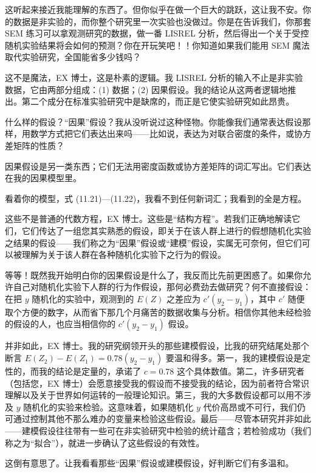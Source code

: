 这听起来接近我能理解的东西了。但你似乎在做一个巨大的跳跃，这让我不安。你的数据是非实验的，而你整个研究里一次实验也没做过。你是在告诉我们，你那套 SEM 练习可以拿观测研究的数据，做一番 LISREL 分析，然后得出一个关于受控随机实验结果将会如何的预测？你在开玩笑吧！！你知道如果我们能用 SEM 魔法取代实验研究，全国能省多少钱吗？

这不是魔法，EX 博士，这是朴素的逻辑。我 LISREL 分析的输入不止是非实验数据，它由两部分组成：(1) 数据；(2) 因果假设。我的结论从这两者逻辑地推出。第二个成分在标准实验研究中是缺席的，而正是它使实验研究如此昂贵。

什么样的假设？“因果”假设？我从没听说过这种怪物。你能像我们通常表达假设那样，用数学方式把它们表达出来吗——比如说，表达为对联合密度的条件，或协方差矩阵的性质？

因果假设是另一类东西；它们无法用密度函数或协方差矩阵的词汇写出。它们表达在我的因果模型里。

看着你的模型，式 \textup{(11.21)}—\textup{(11.22)}，我看不到任何新词汇；我看到的全是方程。

这些不是普通的代数方程，EX 博士。这些是“结构方程”。若我们正确地解读它们，它们传达了一组您其实熟悉的假设，即关于在该人群上进行的假想随机化实验之结果的假设——我们称之为“因果”假设或“建模”假设，实属无可奈何，但它们可以被理解为关于该人群在各种随机化实验下之行为的假设。

等等！既然我开始明白你的因果假设是什么了，我反而比先前更困惑了。如果你允许自己对随机化实验下人群的行为作假设，那何必费劲去做研究？何不直接假设：在把 $y$ 随机化的实验中，观测到的 $E(Z)$ 之差应为 $c'(y_2-y_1)$，其中 $c'$ 随便取个方便的数字，从而省下那几个月痛苦的数据收集与分析。相信你其他未经检验的假设的人，也应当相信你的 $c'(y_2-y_1)$ 假设。

并非如此，EX 博士。我的研究纲领开头的那些建模假设，比我的研究结尾处那个断言 $E(Z_2)-E(Z_1)=0.78(y_2-y_1)$ 要温和得多。第一，我的建模假设是定性的，而我的结论是定量的，承诺了 $c=0.78$ 这个具体数值。第二，许多研究者（包括您，EX 博士）会愿意接受我的假设而不接受我的结论，因为前者符合常识理解以及关于世界如何运转的一般理论知识。第三，我的大多数假设都可以用不涉及 $y$ 随机化的实验来检验。这意味着，如果随机化 $y$ 代价高昂或不可行，我们仍可通过控制其他不那么难办的变量来检验这些假设。最后——尽管本研究并非如此——建模假设往往带有一些可在非实验研究中检验的统计蕴含；若检验成功（我们称之为“拟合”），就进一步确认了这些假设的有效性。

这倒有意思了。让我看看那些“因果”假设或建模假设，好判断它们有多温和。

